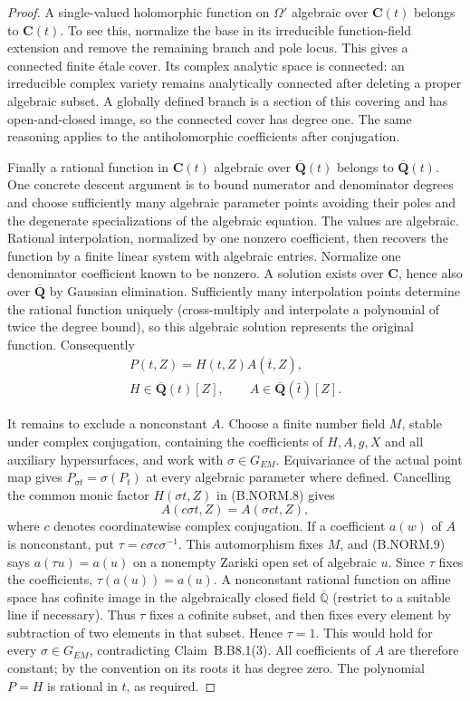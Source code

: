 \begin{proof}
A single-valued holomorphic function on $\Omega'$ algebraic over
$\mathbf C(t)$ belongs to $\mathbf C(t)$. To see this, normalize
the base in its irreducible function-field extension and remove
the remaining branch and pole locus. This gives a connected
finite \'etale cover. Its complex analytic space is connected:
an irreducible complex variety remains analytically connected
after deleting a proper algebraic subset. A globally defined
branch is a section of this covering and has open-and-closed
image, so the connected cover has degree one. The same reasoning
applies to the antiholomorphic coefficients after conjugation.

Finally a rational function in $\mathbf C(t)$ algebraic over
$\overline{\mathbf Q}(t)$ belongs to
$\overline{\mathbf Q}(t)$. One concrete descent argument is to
bound numerator and denominator degrees and choose sufficiently
many algebraic parameter points avoiding their poles and the
degenerate specializations of the algebraic equation. The values
are algebraic. Rational interpolation, normalized by one nonzero
coefficient, then recovers the function by a finite linear system
with algebraic entries. Normalize one denominator coefficient
known to be nonzero. A solution exists over $\mathbf C$, hence
also over $\overline{\mathbf Q}$ by Gaussian elimination.
Sufficiently many interpolation points determine the rational
function uniquely (cross-multiply and interpolate a polynomial
of twice the degree bound), so this algebraic solution represents
the original function. Consequently
\[
 \begin{gathered}
 P(t,Z)=H(t,Z)A(\overline t,Z),\\
 H\in\overline{\mathbf Q}(t)[Z],\qquad
 A\in\overline{\mathbf Q}(\bar t)[Z].
 \end{gathered}\tag{B.NORM.8}
\]

It remains to exclude a nonconstant $A$.  Choose a finite number
field $M$, stable under complex conjugation, containing the
coefficients of $H,A,g,X$ and all auxiliary hypersurfaces, and
work with $\sigma\in G_{EM}$.  Equivariance of the actual point
map gives $P_{\sigma t}=\sigma(P_t)$ at every algebraic parameter
where defined.  Cancelling the common monic factor $H(\sigma t,Z)$
in (B.NORM.8) gives
\[
 A(c\sigma t,Z)=A(\sigma c t,Z),                        \tag{B.NORM.9}
\]
where $c$ denotes coordinatewise complex conjugation.  If a
coefficient $a(w)$ of $A$ is nonconstant, put
$\tau=c\sigma c\sigma^{-1}$.  This automorphism fixes $M$, and
(B.NORM.9) says $a(\tau u)=a(u)$ on a nonempty Zariski open set
of algebraic $u$.  Since $\tau$ fixes the coefficients,
$\tau(a(u))=a(u)$.  A nonconstant rational function on affine
space has cofinite image in the algebraically closed field
$\overline{\mathbb Q}$ (restrict to a suitable line if necessary).
Thus $\tau$ fixes a cofinite subset, and then fixes every element
by subtraction of two elements in that subset.  Hence $\tau=1$.
This would hold for every $\sigma\in G_{EM}$, contradicting
Claim~B.B8.1(3).  All coefficients of $A$ are therefore constant;
by the convention on its roots it has degree zero.  The polynomial
$P=H$ is rational in $t$, as required.
\end{proof}

